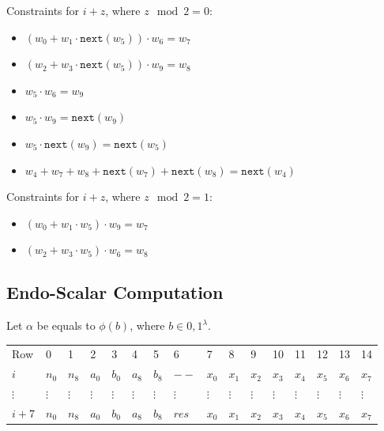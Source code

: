 Constraints for $i + z$, where $z\mod 2 = 0$:
\begin{itemize}
    \item $(w_0 + w_1 \cdot \texttt{next}(w_5)) \cdot w_6 = w_7$
    \item $(w_2 + w_3 \cdot \texttt{next}(w_5)) \cdot w_9 = w_8$
    \item $w_5 \cdot w_6 = w_9$
    \item $w_5 \cdot w_9 = \texttt{next}(w_9)$
    \item $w_5 \cdot \texttt{next}(w_9) = \texttt{next}(w_5)$
    \item $w_4 + w_7 + w_8 + \texttt{next}(w_7) + \texttt{next}(w_8) = \texttt{next}(w_4)$
\end{itemize}

Constraints for $i + z$, where $z\mod 2 = 1$:
\begin{itemize}
    \item $(w_0 + w_1 \cdot w_5) \cdot w_9 = w_7$
    \item $(w_2 + w_3 \cdot w_5) \cdot w_6 = w_8$
\end{itemize}

\subsection{Endo-Scalar Computation}
Let $\alpha$ be equals to $\phi(b)$, where $b \in {0,1}^{\lambda}$.
\begin{center}
    \begin{table}[H]
        \begin{tabular}{llllllllllllllll}
            Row    & 0        & 1        & 2        & 3        & 4        & 5        & 6        & 7        & 8        & 9        & 10       & 11       & 12       & 13       & 14       \\
            $i$   & $n_0$    & $n_8$    & $a_0$    & $b_0$    & $a_8$    & $b_8$   & $--$ & $x_0$      & $x_1$    & $x_2$    & $x_3$    & $x_4$    & $x_5$    & $x_6$ & $x_7$ \\
            $\vdots$ & $\vdots$ & $\vdots$ & $\vdots$ & $\vdots$ & $\vdots$ & $\vdots$ & $\vdots$ & $\vdots$ & $\vdots$ & $\vdots$ & $\vdots$ & $\vdots$ & $\vdots$ & $\vdots$ & $\vdots$ \\
            $i + 7$   & $n_0$    & $n_8$    & $a_0$    & $b_0$    & $a_8$    & $b_8$   & $res$ & $x_0$      & $x_1$    & $x_2$    & $x_3$    & $x_4$    & $x_5$    & $x_6$ & $x_7$ \\
        \end{tabular}
    \end{table}
\end{center}

